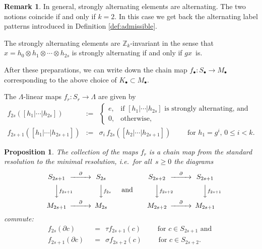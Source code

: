 \documentclass[11pt,a4paper,draft]{article}
\newcommand{\Z}{{\mathbb Z}}
\newcommand{\tens}{\otimes}
\newcommand{\deq}{:=}
\newcommand{\dd}{\partial}
\newtheorem{proposition}[theorem]{Proposition}
\theoremstyle{definition}
\newtheorem{remark}[theorem]{Remark}
\begin{document}
\begin{remark} In general, strongly alternating elements are
alternating. The two
notions coincide if and only if $k=2$. In this case we get back
the alternating label patterns introduced in Definition \ref{def:admissible}.
\end{remark}

The strongly alternating elements are $\Z_k$-invariant in the sense that
$x = h_0 \tens h_1 \tens \cdots \tens h_{2s}$ is strongly
alternating if and only if $gx$~is.

After these preparations, we can write down the chain map $f_\bullet\colon S_\bullet\to M_\bullet$
corresponding to the above choice of $K_\bullet \subset M_\bullet$.

The $\Lambda$-linear maps $f_r: S_r \to \Lambda$ are given by
\begin{eqnarray*}
    f_{2s}([h_1|\cdots|h_{2s}]) & \deq &
    \begin{cases}
        e, & \text{if $[h_1|\cdots|h_{2s}]$ is strongly alternating, and}\\
        0, & \text{otherwise,}
    \end{cases}\\[3mm]
    f_{2s+1}([h_1|\cdots|h_{2s+1}]) & \deq & \sigma_i \,
    f_{2s}([h_2|\cdots|h_{2s+1}])\qquad \text{ for $h_1 = g^i$, $0 \leq i < k$.}
\end{eqnarray*}


\begin{proposition}\label{prop:f-chain-map}
    The collection of the maps $f_r$ is a chain map from the standard
    resolution to the minimal resolution, i.e.\ for all~$s\ge0$ the diagrams
    \[
    \begin{CD}
        S_{2s+1} @>\dd>> S_{2s}     \\
        @VVf_{2s+1}V @VVf_{2s}V\\
        M_{2s+1} @>\dd>> M_{2s}     \\
    \end{CD}
    \qquad\text{and}\qquad
    \begin{CD}
        S_{2s+2} @>\dd>> S_{2s+1}     \\
        @VVf_{2s+2}V @VVf_{2s+1}V\\
        M_{2s+2} @>\dd>> M_{2s+1}     \\
    \end{CD}
    \]
    commute:
   \begin{align*}
       f_{2s}(\dd c) &\ \ =\ \ \tau f_{2s+1}(c)
           \qquad\text{ for $c \in S_{2s+1}$ and }\\
           f_{2s+1}(\dd c) &\ \ =\ \ \sigma f_{2s+2}(c)
           \qquad\text{ for $c \in S_{2s+2}$.}
   \end{align*}
\end{proposition}
\end{document}
